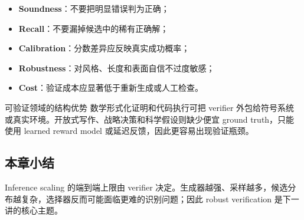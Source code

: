\begin{itemize}
    \item \textbf{Soundness}：不要把明显错误判为正确；
    \item \textbf{Recall}：不要漏掉候选中的稀有正确解；
    \item \textbf{Calibration}：分数差异应反映真实成功概率；
    \item \textbf{Robustness}：对风格、长度和表面自信不过度敏感；
    \item \textbf{Cost}：验证成本应显著低于重新生成或人工检查。
\end{itemize}

\begin{knowledgebox}{可验证领域的结构优势}
数学形式化证明和代码执行可把 verifier 外包给符号系统或真实环境。开放式写作、战略决策和科学假设则缺少便宜 ground truth，只能使用 learned reward model 或延迟反馈，因此更容易出现验证瓶颈。
\end{knowledgebox}

\subsection{本章小结}

Inference scaling 的端到端上限由 verifier 决定。生成器越强、采样越多，候选分布越复杂，选择器反而可能面临更难的识别问题；因此 robust verification 是下一讲的核心主题。

